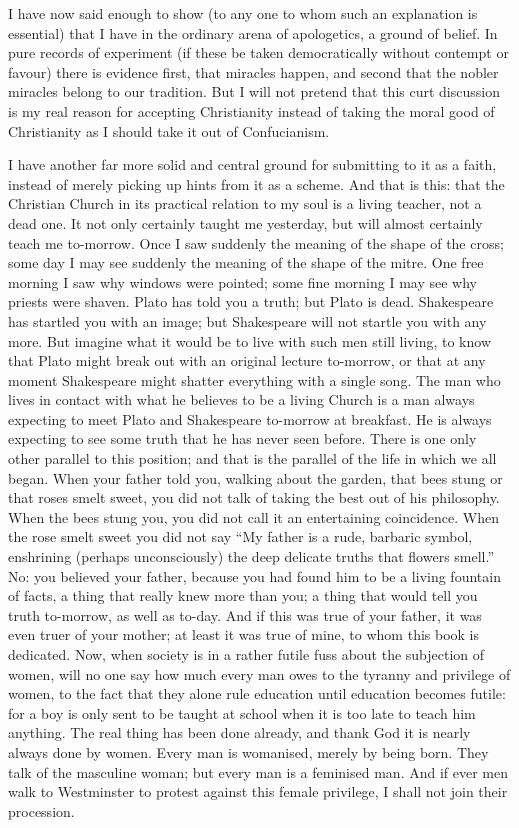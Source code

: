 I have now said enough to show (to any one to whom such an explanation is essential) that I have in the ordinary arena of apologetics, a ground of belief. In pure records of experiment (if these be taken democratically without contempt or favour) there is evidence first, that miracles happen, and second that the nobler miracles belong to our tradition. But I will not pretend that this curt discussion is my real reason for accepting Christianity instead of taking the moral good of Christianity as I should take it out of Confucianism.

I have another far more solid and central ground for submitting to it as a faith, instead of merely picking up hints from it as a scheme. And that is this: that the Christian Church in its practical relation to my soul is a living teacher, not a dead one. It not only certainly taught me yesterday, but will almost certainly teach me to-morrow. Once I saw suddenly the meaning of the shape of the cross; some day I may see suddenly the meaning of the shape of the mitre. One free morning I saw why windows were pointed; some fine morning I may see why priests were shaven. Plato has told you a truth; but Plato is dead. Shakespeare has startled you with an image; but Shakespeare will not startle you with any more. But imagine what it would be to live with such men still living, to know that Plato might break out with an original lecture to-morrow, or that at any moment Shakespeare might shatter everything with a single song. The man who lives in contact with what he believes to be a living Church is a man always expecting to meet Plato and Shakespeare to-morrow at breakfast. He is always expecting to see some truth that he has never seen before. There is one only other parallel to this position; and that is the parallel of the life in which we all began. When your father told you, walking about the garden, that bees stung or that roses smelt sweet, you did not talk of taking the best out of his philosophy. When the bees stung you, you did not call it an entertaining coincidence. When the rose smelt sweet you did not say “My father is a rude, barbaric symbol, enshrining (perhaps unconsciously) the deep delicate truths that flowers smell.” No: you believed your father, because you had found him to be a living fountain of facts, a thing that really knew more than you; a thing that would tell you truth to-morrow, as well as to-day. And if this was true of your father, it was even truer of your mother; at least it was true of mine, to whom this book is dedicated. Now, when society is in a rather futile fuss about the subjection of women, will no one say how much every man owes to the tyranny and privilege of women, to the fact that they alone rule education until education becomes futile: for a boy is only sent to be taught at school when it is too late to teach him anything. The real thing has been done already, and thank God it is nearly always done by women. Every man is womanised, merely by being born. They talk of the masculine woman; but every man is a feminised man. And if ever men walk to Westminster to protest against this female privilege, I shall not join their procession.

